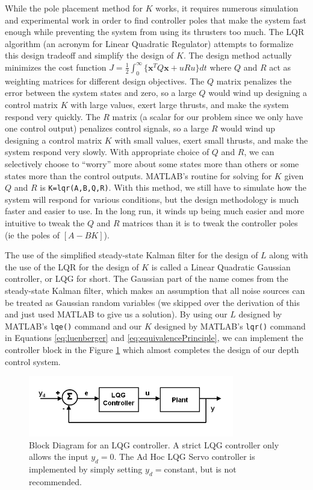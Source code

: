 \documentclass{article}
\begin{document}
While the pole placement method for $K$ works, it requires numerous simulation and experimental work in order to find controller poles that make the system fast enough while preventing the system from using its thrusters too much.  The LQR algorithm (an acronym for Linear Quadratic Regulator) attempts to formalize this design tradeoff and simplify the design of $K$.  The design method actually minimizes the cost function $J=\frac{1}{2}\int_{0}^{\infty}\{\pmb{x}^TQ\pmb{x}+uRu\}dt$ where $Q$ and $R$ act as weighting matrices for different design objectives.  The $Q$ matrix penalizes the error between the system states and zero, so a large $Q$ would wind up designing a control matrix $K$ with large values, exert large thrusts, and make the system respond very quickly.  The $R$ matrix (a scalar for our problem since we only have one control output) penalizes control signals, so a large $R$ would wind up designing a control matrix $K$ with small values, exert small thrusts, and make the system respond very slowly.  With appropriate choice of $Q$ and $R$, we can selectively choose to ``worry'' more about some states more than others or some states more than the control outputs.  MATLAB's routine for solving for $K$ given $Q$ and $R$ is \verb+K=lqr(A,B,Q,R)+.  With this method, we still have to simulate how the system will respond for various conditions, but the design methodology is much faster and easier to use.  In the long run, it winds up being much easier and more intuitive to tweak the $Q$ and $R$ matrices than it is to tweak the controller poles (ie the poles of $[A-BK]$).

The use of the simplified steady-state Kalman filter for the design of $L$ along with the use of the LQR for the design of $K$ is called a Linear Quadratic Gaussian controller, or LQG for short.  The Gaussian part of the name comes from the steady-state Kalman filter, which makes an assumption that all noise sources can be treated as Gaussian random variables (we skipped over the derivation of this and just used MATLAB to give us a solution).  By using our $L$ designed by MATLAB's \verb+lqe()+ command and our $K$ designed by MATLAB's \verb+lqr()+ command in Equations \ref{eq:luenberger} and \ref{eq:equivalencePrinciple}, we can implement the controller block in the Figure \ref{fig:LQGBlockDiagram} which almost completes the design of our depth control system.

\begin{figure}[h]
\includegraphics[width=0.8\textwidth]{LQGBlockDiagram.PNG}
\centering
\caption{Block Diagram for an LQG controller.  A strict LQG controller only allows the input $y_d=0$.  The Ad Hoc LQG Servo controller is implemented by simply setting $y_d=$constant, but is not recommended.}
\label{fig:LQGBlockDiagram}
\end{figure}
\end{document}
